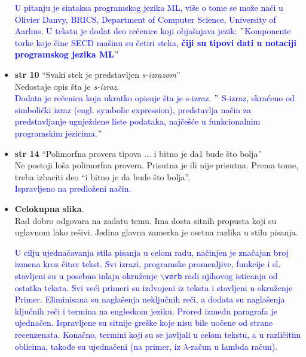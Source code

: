 \documentclass[a4paper]{report}
\newcommand{\odgovor}[1]{\textcolor{blue}{#1}}
\begin{document}
\begin{itemize}
\odgovor{U pitanju je sintaksa programskog jezika ML, više o tome se može naći u Olivier Danvy, BRICS, Department of Computer Science, University of Aarhus. U tekstu je dodat deo rečenice koji objašnjava jezik: $"$Komponente torke koje čine SECD mašinu su četiri steka, \textbf{čiji su tipovi dati u notaciji programskog jezika ML$"$}}

\item \textbf{str 10} ``Svaki stek je predstavljen \textit{s-izrazom}'' \\ Nedostaje opis šta je \textit{s-izraz}.\\

\odgovor{Dodata je rečenica koja ukratko opisuje šta je s-izraz. $"$ S-izraz, skraćeno od simbolički izraz (engl. symbolic expression), predstavlja način za predstavljanje ugnježdene liste podataka, najčešće u funkcionalnim programskim jezicima.$"$}

\item \textbf{str 14} ``Polimorfna provera tipova ... i bitno je da1 bude što bolja'' \\ Ne postoji loša polimorfna provera. Prisutna je ili nije prisutna. Prema tome, treba izbaciti deo ``i bitno je da bude što bolja''.\\

\odgovor{Ispravljeno na predloženi način.}

\item \textbf{Celokupna slika}. \\Rad dobro odgovara na zadatu temu. Ima dosta sitnih propusta koji su uglavnom lako rešivi. Jedina glavna zamerka je osetna razlika u stilu pisanja.

\odgovor{U cilju ujednačavanja stila pisanja u celom radu, načinjen je značajan broj izmena kroz čitav tekst. Svi izrazi, programske promenljive, funkcije i sl. stavljeni su u posebno inlajn okruženje \texttt{$\backslash$verb} radi njihovog isticanja od ostatka teksta. Svi veći primeri su izdvojeni iz teksta i stavljeni u okruženje Primer. Eliminisana su naglašenja neključnih reči, a dodata su naglašenja ključnih reči i termina na engleskom jeziku. Prored između paragrafa je ujednačen. Ispravljene su sitnije greške koje nisu bile uočene od strane recenzenata. Konačno, termini koji su se javljali u celom tekstu, a u različitim oblicima, takođe su ujednačeni (na primer, iz $\lambda$-račun u lambda račun).}

\end{itemize}
\end{document}

